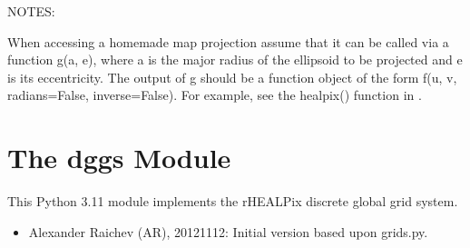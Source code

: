 \documentclass[a4paper,12ptopenany,oneside,english]{sphinxmanual}
\begin{document}
\begin{fulllineitems}
\begin{sphinxVerbatim}[commandchars=\\\{\}]
 
     
      
   
  
\end{sphinxVerbatim}

\sphinxAtStartPar
NOTES:

\sphinxAtStartPar
When accessing a homemade map projection assume that it can be called via
a function g(a, e), where a is the major radius of the ellipsoid to be
projected and e is its eccentricity.
The output of g should be a function object of the form
f(u, v, radians=False, inverse=False).
For example, see the healpix() function in .

\end{fulllineitems}


\sphinxstepscope


\chapter{The dggs Module}
\label{\detokenize{dggs:module-rhealpixdggs.dggs}}\label{\detokenize{dggs:the-dggs-module}}\label{\detokenize{dggs::doc}}
\sphinxAtStartPar
This Python 3.11 module implements the rHEALPix discrete global grid system.
\begin{itemize}
\item {} 
\sphinxAtStartPar
Alexander Raichev (AR), 2012\sphinxhyphen{}11\sphinxhyphen{}12: Initial version based upon grids.py.

\end{itemize}
\end{document}
